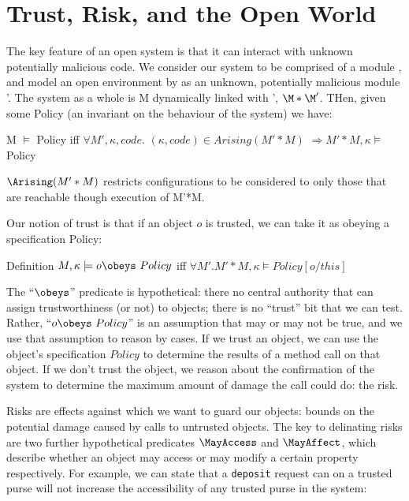 \section{Trust, Risk, and the Open World}



The key feature of an open system is that it can interact with unknown
potentially malicious code.  We consider our system to be comprised of
a module \M, and model an open environment by as an unknown,
potentially malicious module \M'.  
The system as a whole is M dynamically linked with \M', $\M*\M'$.
THen, given some Policy (an invariant on the behaviour of the
system) we have: 

\begin{definition}
M $\models$ Policy    iff
$\forall M', \kappa, code.$
       $(\kappa,code) \in Arising(M'*M)$
                  $\Rightarrow   M'*M, \kappa \models$  Policy
\end{definition}

 
$\Arising(M'*M)$ restricts configurations to be considered to only those that are reachable though execution of M'*M.

   Our notion of trust is that if an object $o$ is
trusted, we can take it as obeying a specification Policy:

\begin{definition}
Definition 
$M, \kappa \models o \obeys\ Policy$    iff
                                        $\forall M'.  M'*M, \kappa \models Policy[o/this]$
\end{definition}

The ``$\obeys$'' predicate is hypothetical: there no central authority
that can assign trustworthiness (or not) to objects; there is no
``trust'' bit that we can test. Rather, ``$o \obeys\ Policy$'' is an
assumption that may or may not be true, and we use that assumption to
reason by cases. If we trust an object, we can use the object's
specification $Policy$ to determine the results of a method call on
that object. If we don't trust the object, we reason about the
confirmation of the system to determine the maximum amount of damage
the call could do: the risk.

  Risks are effects against which we want to guard our
objects: bounds on the potential damage caused by calls to untrusted
objects.  The key to delinating risks are two further hypothetical
predicates $\MayAccess$ and $\MayAffect$, which describe whether an
object may access or may modify a certain property respectively.
For example, we can state that a \lstinline+deposit+ request can on a
trusted purse will not increase the accessibility of any trusted purse
in the system:

